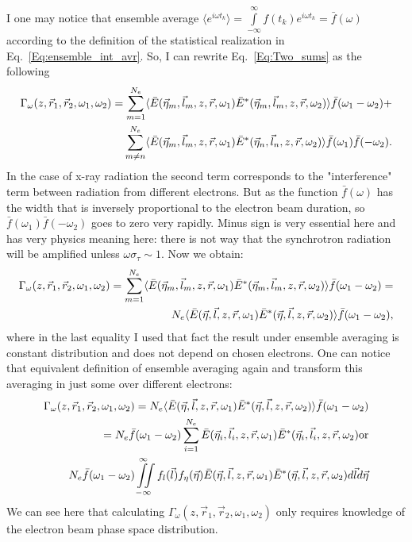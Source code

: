      I one may notice that ensemble average $\langle e^{i \omega t_k}\rangle = \int\limits_{-\infty}^{\infty} f(t_k) e^{i \omega t_k} = \bar{f} (\omega)$ according to the definition of the statistical realization in Eq.~\ref{Eq:ensemble_int_avr}. So, I can rewrite Eq.~\ref{Eq:Two_sums} as the following
    \begin{align}
        \Gamma_\omega (z, \vec{r}_1, \vec{r}_2, \omega_1, \omega_2) =  
        \sum_{m = 1}^{N_e} \langle\bar{E}(\vec{\eta}_m, \vec{l}_m, z, \vec{r}, \omega_1)\bar{E}^*(\vec{\eta}_m, \vec{l}_m, z, \vec{r}, \omega_2) \rangle\bar{f}(\omega_1 - \omega_2) + \cr
        \sum_{m \neq n}^{N_e} \langle\bar{E}(\vec{\eta}_m, \vec{l}_m, z, \vec{r}, \omega_1)\bar{E}^*(\vec{\eta}_n, \vec{l}_n, z, \vec{r}, \omega_2)\rangle\bar{f}(\omega_1)\bar{f}(-\omega_2).
        \label{Eq:Two_sums}
    \end{align}
    In the case of x-ray radiation the second term corresponds to the "interference" term between radiation from different electrons. But as the function $\bar{f}(\omega)$ has the width that is inversely proportional to the electron beam duration, so $\bar{f}(\omega_1)\bar{f}(-\omega_2)$ goes to zero very rapidly. Minus sign is very essential here and has very physics meaning here: there is not way that the synchrotron radiation will be amplified unless $\omega\sigma_{\tau} \sim 1$.
    Now we obtain:
    \begin{align}
        \Gamma_\omega (z, \vec{r}_1, \vec{r}_2, \omega_1, \omega_2) =  
        \sum_{m = 1}^{N_e} \langle\bar{E}(\vec{\eta}_m, \vec{l}_m, z, \vec{r}, \omega_1)\bar{E}^*(\vec{\eta}_m, \vec{l}_m, z, \vec{r}, \omega_2) \rangle\bar{f}(\omega_1 - \omega_2) = \cr 
        N_e\langle\bar{E}(\vec{\eta}, \vec{l}, z, \vec{r}, \omega_1)\bar{E}^*(\vec{\eta}, \vec{l}, z, \vec{r}, \omega_2) \rangle\bar{f}(\omega_1 - \omega_2),
        \label{Eq:}
    \end{align}
    where in the last equality I used that fact the result under ensemble averaging is constant distribution and does not depend on chosen electrons.
    One can notice that equivalent definition of ensemble averaging again and transform this averaging in just some over different electrons:
    \begin{align}
        \Gamma_\omega (z, \vec{r}_1, \vec{r}_2, \omega_1, \omega_2) = 
        N_e\langle\bar{E}(\vec{\eta}, \vec{l}, z, \vec{r}, \omega_1)\bar{E}^*(\vec{\eta}, \vec{l}, z, \vec{r}, \omega_2) \rangle\bar{f}(\omega_1 - \omega_2) \cr = 
        N_e \bar{f}(\omega_1 - \omega_2) \sum_{i = 1}^{N_e}\bar{E}(\vec{\eta}_i, \vec{l}_i, z, \vec{r}, \omega_1)\bar{E}^*(\vec{\eta}_i, \vec{l}_i, z, \vec{r}, \omega_2) \textup{or} \cr
        N_e \bar{f}(\omega_1 - \omega_2) \iint \limits_{-\infty}^{\infty}f_{l}(\vec{l}) f_{\eta}(\vec{\eta}) \bar{E}(\vec{\eta}, \vec{l}, z, \vec{r}, \omega_1)\bar{E}^*(\vec{\eta}, \vec{l}, z, \vec{r}, \omega_2)d\vec{l} d\vec{\eta}
        \label{Eq:}
    \end{align}    
    We can see here that calculating $\Gamma_\omega (z, \vec{r}_1, \vec{r}_2, \omega_1, \omega_2)$ only requires knowledge of the electron beam phase space distribution. 

